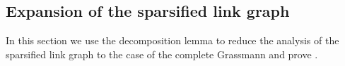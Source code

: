 



\subsection{Expansion of the sparsified link graph} \label{sec:lemma-sparsified-links-proof}
In this section we use the decomposition lemma to reduce the analysis of the sparsified link graph to the case of the complete Grassmann and prove .

